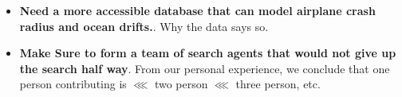\documentclass[12pt, letterpaper]{article}  %
\theoremstyle{definition}
\theoremstyle{remark}
\theoremstyle{plain}
\begin{document}

\begin{itemize}
\item \textbf{Need a more accessible database that can model airplane crash radius and ocean drifts.}.  Why the data says so.
\item \textbf{Make Sure to form a team of search agents that would not give up the search half way}. From our personal experience, we conclude that one person contributing is $\lll$ two person $\lll$ three person, etc.
\end{itemize}






\end{document}
